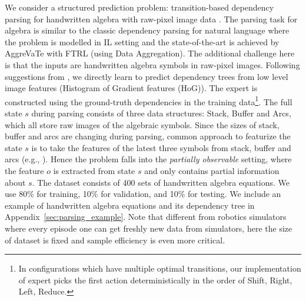 \documentclass{article}
\begin{document}
We consider a structured prediction problem: transition-based dependency parsing for handwritten algebra with raw-pixel image data \cite{duyckpredicting}. The parsing task for algebra is similar to the classic dependency parsing for natural language \cite{chang2015learning_dependency} where the problem is modelled in IL setting and the state-of-the-art  is achieved by AggreVaTe with FTRL (using Data Aggregation). The additional challenge here is that the inputs are handwritten algebra symbols in raw-pixel images. Following suggestions from \cite{duyckpredicting}, we directly learn to predict dependency trees from low level image features (Histogram of Gradient features (HoG)). The expert is constructed using the ground-truth dependencies in the training data\footnote{In configurations which have multiple optimal transitions, our implementation of expert picks the first action deterministically in the order of Shift, Right, Left, Reduce.}. The full state $s$ during parsing consists of three data structures: Stack, Buffer and Arcs, which all store raw images of the algebraic symbols. Since the sizes of stack, buffer and arcs are changing during parsing, common approach to featurize the state $s$ is to take the features of the latest three symbols from stack, buffer and arcs (e.g., \cite{chang2015learning_dependency}). Hence the problem falls into the \emph{partially observable} setting, where the feature $o$ is extracted from state $s$ and only contains partial information about $s$. %
The dataset consists of 400 sets of handwritten algebra equations. We use 80$\%$ for training, 10$\%$ for validation, and 10$\%$ for testing. We include an example of handwritten algebra equations and its dependency tree in Appendix~\ref{sec:parsing_example}. Note that different from robotics simulators where every episode one can get freshly new data from simulators, here the size of dataset is fixed and sample efficiency is even more critical. 
\end{document}
